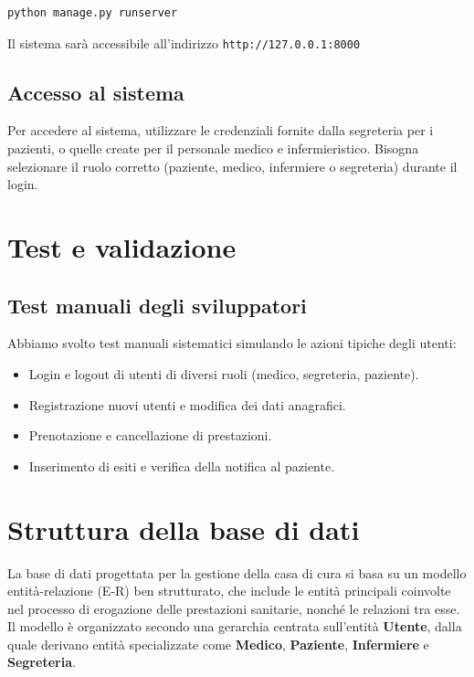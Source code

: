 \documentclass[a4paper,12pt]{article}
\begin{document}
\begin{lstlisting}
python manage.py runserver
\end{lstlisting}

Il sistema sarà accessibile all'indirizzo \texttt{http://127.0.0.1:8000}
\subsection{Accesso al sistema}
Per accedere al sistema, utilizzare le credenziali fornite dalla segreteria per i pazienti, o quelle create per il personale medico e infermieristico.
Bisogna selezionare il ruolo corretto (paziente, medico, infermiere o segreteria) durante il login.

\newpage
\section{Test e validazione}

\subsection{Test manuali degli sviluppatori}
Abbiamo svolto test manuali sistematici simulando le azioni tipiche degli utenti:
\begin{itemize}
    \item Login e logout di utenti di diversi ruoli (medico, segreteria, paziente).
    \item Registrazione nuovi utenti e modifica dei dati anagrafici.
    \item Prenotazione e cancellazione di prestazioni.
    \item Inserimento di esiti e verifica della notifica al paziente.
\end{itemize}

\section{Struttura della base di dati}

La base di dati progettata per la gestione della casa di cura si basa su un modello entità-relazione (E-R) ben strutturato, 
che include le entità principali coinvolte nel processo di erogazione delle prestazioni sanitarie, nonché le relazioni tra esse. 
Il modello è organizzato secondo una gerarchia centrata sull’entità \textbf{Utente}, dalla quale derivano entità specializzate come 
\textbf{Medico}, \textbf{Paziente}, \textbf{Infermiere} e \textbf{Segreteria}.
\end{document}
